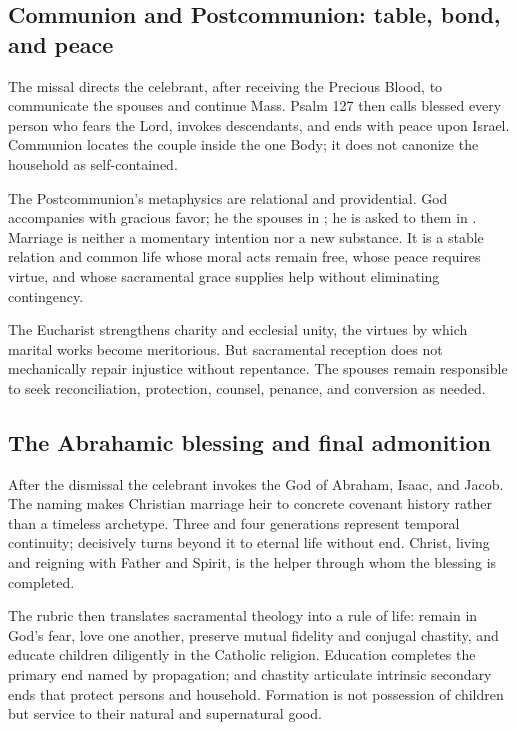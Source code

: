 \begin{deepstudy}
\sectionguard
\subsection*{Communion and Postcommunion: table, bond, and peace\enspace{}}

The missal directs the celebrant, after receiving the Precious Blood, to communicate the spouses and continue Mass. Psalm 127 then calls blessed every person who fears the Lord, invokes descendants, and ends with peace upon Israel. Communion locates the couple inside the one Body; it does not canonize the household as self-contained.

The Postcommunion's metaphysics are relational and providential. God accompanies  with gracious favor; he  the spouses in ; he is asked to  them in . Marriage is neither a momentary intention nor a new substance. It is a stable relation and common life whose moral acts remain free, whose peace requires virtue, and whose sacramental grace supplies help without eliminating contingency.

The Eucharist strengthens charity and ecclesial unity, the virtues by which marital works become meritorious. But sacramental reception does not mechanically repair injustice without repentance. The spouses remain responsible to seek reconciliation, protection, counsel, penance, and conversion as needed.

\sectionguard
\subsection*{The Abrahamic blessing and final admonition\enspace{}}

After the dismissal the celebrant invokes the God of Abraham, Isaac, and Jacob. The naming makes Christian marriage heir to concrete covenant history rather than a timeless archetype. Three and four generations represent temporal continuity;  decisively turns beyond it to eternal life without end. Christ, living and reigning with Father and Spirit, is the helper through whom the blessing is completed.

The rubric then translates sacramental theology into a rule of life: remain in God's fear, love one another, preserve mutual fidelity and conjugal chastity, and educate children diligently in the Catholic religion. Education completes the primary end named by propagation;  and chastity articulate intrinsic secondary ends that protect persons and household. Formation is not possession of children but service to their natural and supernatural good.


\end{deepstudy}
